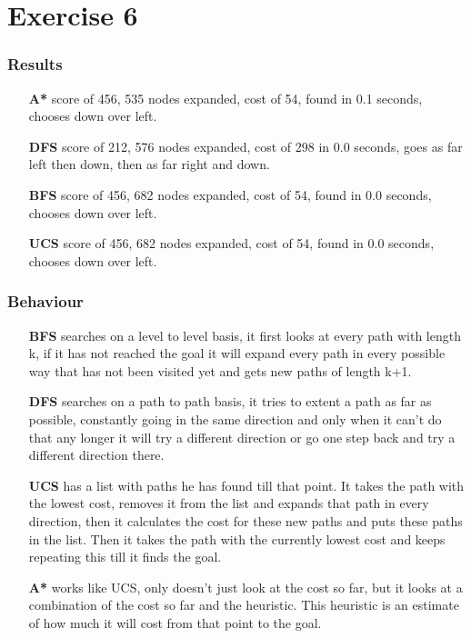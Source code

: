 \section{Exercise 6}
\subsubsection{Results}
\begin{itemize}
\item [\textbf{A*}] score of 456, 535 nodes expanded, cost of 54, found in 0.1 seconds, chooses down over left.
\item [\textbf{DFS}] score of 212, 576 nodes expanded, cost of 298 in 0.0 seconds, goes as far left then down, then as far right and down.
\item [\textbf{BFS}] score of 456, 682 nodes expanded, cost of 54, found in 0.0 seconds, chooses down over left.
\item [\textbf{UCS}] score of 456, 682 nodes expanded, cost of 54, found in 0.0 
seconds, chooses down over left.
\end{itemize}

\subsubsection{Behaviour}
\begin{itemize}
\item [\textbf{BFS}] searches on a level to level basis, it first looks at every path with length k, if it has not reached the goal 
it will expand every path in every possible way that has not been visited yet and gets new paths of length k+1.
\item [\textbf{DFS}] searches on a path to path basis, it tries to extent a path as far as possible, constantly going in the same direction
and only when it can't do that any longer it will try a different direction or go one step back and try a different direction there.
\item [\textbf{UCS}] has a list with paths he has found till that point. It takes the path with the lowest cost, removes it from the list 
and expands that path in every direction, then it calculates the cost for these new paths and puts these paths in the list. 
Then it takes the path with the currently lowest cost and keeps repeating this till it finds the goal.
\item [\textbf{A*}] works like UCS, only doesn't just look at the cost so far, but it looks at a combination of the cost so far and the heuristic.
This heuristic is an estimate of how much it will cost from that point to the goal.
\end{itemize}

